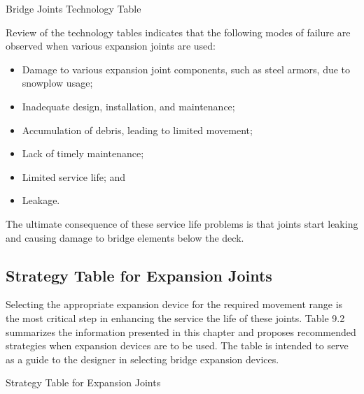 \begin{table}
  \caption{Bridge Joints Technology Table}
  \label{tab:bridge-joints-technology}
\end{table}

Review of the technology tables indicates that the following modes of failure are observed when various
expansion joints are used:
\begin{itemize}
  \item Damage to various expansion joint components, such as steel armors, due to snowplow usage;
  \item Inadequate design, installation, and maintenance;
  \item Accumulation of debris, leading to limited movement;
  \item Lack of timely maintenance;
  \item Limited service life; and
  \item Leakage.
\end{itemize}

The ultimate consequence of these service life problems is that joints start leaking and causing damage to bridge
elements below the deck.

\subsection{Strategy Table for Expansion Joints}
Selecting the appropriate expansion device for the required movement range is the most critical step in enhancing
the service the life of these joints. Table 9.2 summarizes the information presented in this chapter and proposes
recommended strategies when expansion devices are to be used. The table is intended to serve as a guide to the
designer in selecting bridge expansion devices.

\begin{table}
  \caption{Strategy Table for Expansion Joints}
  \label{tab:strategy-table-expansion-joints}
\end{table}
